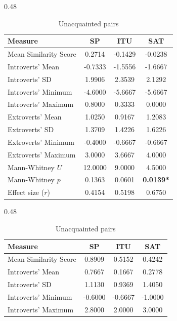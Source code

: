 \documentclass[a4paper,fleqn]{cas-sc}
\begin{document}
\begin{table}[t]
\centering
\caption{Similarity--attraction analysis of subjective evaluations by pair acquaintance.}
\label{tab:similarity_attraction}

\begin{subtable}[t]{0.48\textwidth}
\centering
\caption{Acquainted pairs}
\label{tab:similarity_acquainted}
\begin{tabular}{lccc}
\toprule
\textbf{Measure} & \textbf{SP} & \textbf{ITU} & \textbf{SAT} \\
\midrule
Mean Similarity Score
& 0.2714 & -0.1429 & -0.0238 \\

Introverts' Mean
& -0.7333 & -1.5556 & -1.6667 \\
Introverts' SD
& 1.9906 & 2.3539 & 2.1292 \\
Introverts' Minimum
& -4.6000 & -5.6667 & -5.6667 \\
Introverts' Maximum
& 0.8000 & 0.3333 & 0.0000 \\

Extroverts' Mean
& 1.0250 & 0.9167 & 1.2083 \\
Extroverts' SD
& 1.3709 & 1.4226 & 1.6226 \\
Extroverts' Minimum
& -0.4000 & -0.6667 & -0.6667 \\
Extroverts' Maximum
& 3.0000 & 3.6667 & 4.0000 \\
\midrule
Mann-Whitney $U$
& 12.0000 & 9.0000 & 4.5000 \\
Mann-Whitney $p$
& 0.1363 & 0.0601 & \textbf{0.0139*} \\
Effect size ($r$)
& 0.4154 & 0.5198 & 0.6750 \\
\bottomrule
\end{tabular}
\end{subtable}
\hfill
\begin{subtable}[t]{0.48\textwidth}
\centering
\caption{Unacquainted pairs}
\label{tab:similarity_unacquainted}
\begin{tabular}{lccc}
\toprule
\textbf{Measure} & \textbf{SP} & \textbf{ITU} & \textbf{SAT} \\
\midrule
Mean Similarity Score
& 0.8909 & 0.5152 & 0.4242 \\

Introverts' Mean
& 0.7667 & 0.1667 & 0.2778 \\
Introverts' SD
& 1.1130 & 0.9369 & 1.4050 \\
Introverts' Minimum
& -0.6000 & -0.6667 & -1.0000 \\
Introverts' Maximum
& 2.8000 & 2.0000 & 3.0000 \\


\end{tabular}
\end{subtable}
\end{table}
\end{document}
